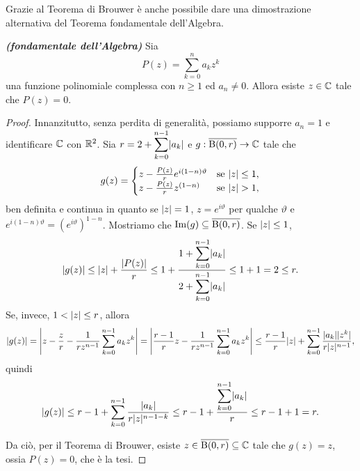 Grazie al Teorema di Brouwer è anche possibile dare una dimostrazione alternativa del Teorema fondamentale dell'Algebra.
\begin{teorema}\textbf{\emph{(fondamentale dell'Algebra)}}
	Sia 
	\[ P(z) = \sum_{k=0}^{n}a_kz^k \]
	una funzione polinomiale complessa con $n\ge 1$ ed $a_n \ne 0$. Allora esiste $z \in \C$ tale che $P(z) = 0$.
\end{teorema}
\begin{proof}
	Innanzitutto, senza perdita di generalità, possiamo supporre $a_n = 1$ e identificare $\C$ con $\R^2$. Sia $r = 2 + \displaystyle\sum_{k=0}^{n-1}\abs{a_k}$ e $g: \overline{\B(0,r)} \to \C$ tale che
	\[ g(z) = \begin{cases}
		z- \frac{P(z)}{r}e^{i(1-n)\vartheta} & \textup{se } \abs{z} \le 1,\\
		z- \frac{P(z)}{r}z^{(1-n)} & \textup{se } \abs{z} > 1,
	\end{cases} \]
	ben definita e continua in quanto se $\abs{z} = 1$, $z = e^{i\vartheta}$ per qualche $\vartheta$ e $e^{i(1-n)\vartheta} = (e^{i\vartheta})^{1-n}$. Mostriamo che $\textup{Im}(g) \subseteq \overline{\B(0,r)}$. Se $\abs{z} \le 1$, 
	\[ \abs{g(z)} \le \abs{z} + \frac{\abs{P(z)}}{r} \le 1 + \frac{1+ \displaystyle\sum_{k=0}^{n-1}\abs{a_k}}{2+ \displaystyle\sum_{k=0}^{n-1}\abs{a_k}} \le 1+ 1 = 2 \le r.\]
	Se, invece, $1<\abs{z}\le r$, allora
	\[ \abs{g(z)} = \abs*{z - \frac{z}{r} - \frac{1}{rz^{n-1}}\sum_{k=0}^{n-1}a_kz^k} = \abs*{\frac{r-1}{r}z -\frac{1}{rz^{n-1}}\sum_{k=0}^{n-1}a_kz^k} \le \frac{r-1}{r}\abs{z} + \sum_{k=0}^{n-1}\frac{\abs{a_k}\abs{z^k}}{r\abs{z}^{n-1}},\]
	quindi 
	\[ \abs{g(z)} \le r-1 + \sum_{k=0}^{n-1}\frac{\abs{a_k}}{r\abs{z}^{n-1-k}} \le r-1 + \frac{\displaystyle\sum_{k=0}^{n-1}\abs{a_k}}{r} \le r-1 + 1 = r.\]
	
	Da ciò, per il Teorema di Brouwer, esiste $z \in \overline{\B(0,r)} \subseteq \C$ tale che $g(z) = z$, ossia $P(z) = 0$, che è la tesi.
\end{proof}

